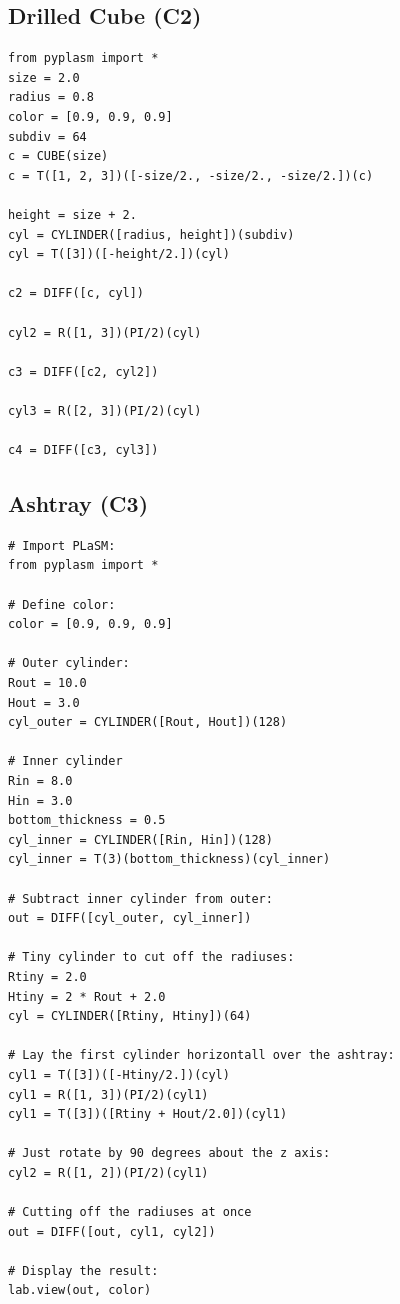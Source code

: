 \documentclass[article,A4,12pt]{llncs}
\begin{document}
\subsection{Drilled Cube (C2)}

\begin{verbatim}
from pyplasm import *
size = 2.0
radius = 0.8
color = [0.9, 0.9, 0.9]
subdiv = 64
c = CUBE(size)
c = T([1, 2, 3])([-size/2., -size/2., -size/2.])(c)

height = size + 2.
cyl = CYLINDER([radius, height])(subdiv)
cyl = T([3])([-height/2.])(cyl)

c2 = DIFF([c, cyl])

cyl2 = R([1, 3])(PI/2)(cyl)

c3 = DIFF([c2, cyl2])

cyl3 = R([2, 3])(PI/2)(cyl)

c4 = DIFF([c3, cyl3])
\end{verbatim}


\subsection{Ashtray (C3)}

\begin{verbatim}
# Import PLaSM:
from pyplasm import *

# Define color:
color = [0.9, 0.9, 0.9]

# Outer cylinder:
Rout = 10.0
Hout = 3.0
cyl_outer = CYLINDER([Rout, Hout])(128)

# Inner cylinder
Rin = 8.0
Hin = 3.0
bottom_thickness = 0.5
cyl_inner = CYLINDER([Rin, Hin])(128)
cyl_inner = T(3)(bottom_thickness)(cyl_inner)

# Subtract inner cylinder from outer:
out = DIFF([cyl_outer, cyl_inner])

# Tiny cylinder to cut off the radiuses:
Rtiny = 2.0
Htiny = 2 * Rout + 2.0
cyl = CYLINDER([Rtiny, Htiny])(64)

# Lay the first cylinder horizontall over the ashtray:
cyl1 = T([3])([-Htiny/2.])(cyl)
cyl1 = R([1, 3])(PI/2)(cyl1)
cyl1 = T([3])([Rtiny + Hout/2.0])(cyl1)

# Just rotate by 90 degrees about the z axis:
cyl2 = R([1, 2])(PI/2)(cyl1)

# Cutting off the radiuses at once
out = DIFF([out, cyl1, cyl2])
 
# Display the result:
lab.view(out, color)
\end{verbatim}
\end{document}
